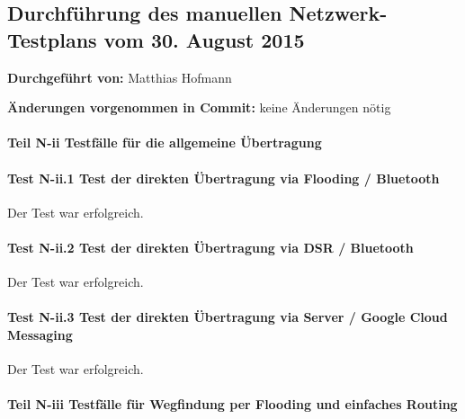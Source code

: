 \subsection{Durchführung des manuellen Netzwerk-Testplans vom 30. August 2015}

\textbf{Durchgeführt von:} Matthias Hofmann

\textbf{Änderungen vorgenommen in Commit:} keine Änderungen nötig

\paragraph{Teil N-ii Testfälle für die allgemeine Übertragung}

\paragraph{Test N-ii.1 Test der direkten Übertragung via Flooding / Bluetooth}

Der Test war erfolgreich.



\paragraph{Test N-ii.2 Test der direkten Übertragung via DSR / Bluetooth}

Der Test war erfolgreich.




\paragraph{Test N-ii.3 Test der direkten Übertragung via Server / Google Cloud Messaging}

Der Test war erfolgreich.




\paragraph{Teil N-iii Testfälle für Wegfindung per Flooding und einfaches Routing}

